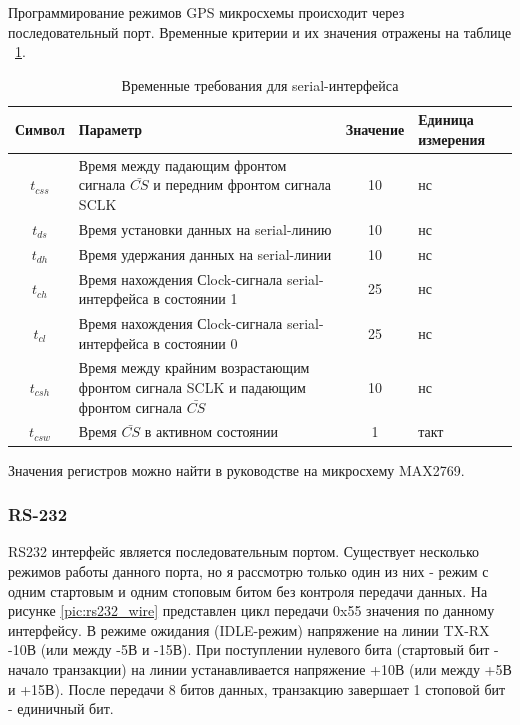 Программирование режимов GPS микросхемы происходит через последовательный порт. Временные критерии и их значения
отражены на таблице ~\ref{tab:gps_serial}.


\begin{table}[h]
\caption{Временные требования для serial-интерфейса}
\label{tab:gps_serial}
\begin{tabular}{|c|p{250pt}|c|p{70pt}|}
 \hline  
  Символ & Параметр & Значение & Единица измерения  \\  
 \hline  
  $t_{css}$  & Время между падающим фронтом сигнала $\bar {CS}$ и передним фронтом сигнала SCLK	& 10 & нс  \\  
 \hline  
  $t_{ds}$   & Время установки данных на serial-линию	& 10 & нс \\  
 \hline  
  $t_{dh}$   & Время удержания данных на serial-линии	& 10 & нс \\  
 \hline  
  $t_{ch}$   & Время нахождения Сlock-сигнала serial-интерфейса в состоянии 1 & 25 & нс \\  
 \hline  
  $t_{cl}$   & Время нахождения Сlock-сигнала serial-интерфейса в состоянии 0 & 25 & нс \\  
 \hline  
  $t_{csh}$  & Время между крайним возрастающим фронтом сигнала SCLK и падающим фронтом сигнала $\bar {CS}$ & 10 & нс \\  
 \hline  
  $t_{csw}$  & Время $\bar {CS}$ в активном состоянии    & 1 & такт \\  
 \hline  
\end{tabular}
\end{table}

Значения регистров можно найти в руководстве на микросхему MAX2769.

\subsubsection*{RS-232}
\label{sec:rs232}
RS232 интерфейс является последовательным портом. Существует несколько режимов работы данного порта, но я рассмотрю только один
из них - режим с одним стартовым и одним стоповым битом без контроля передачи данных. На рисунке \ref{pic:rs232_wire} представлен
цикл передачи 0x55 значения по данному интерфейсу. В режиме ожидания (IDLE-режим) напряжение на линии TX-RX -10В (или между -5В и -15В).
При поступлении нулевого бита (стартовый бит - начало транзакции) на линии устанавливается напряжение +10В (или между +5В и +15В).
После передачи 8 битов данных, транзакцию завершает 1 стоповой бит - единичный бит.

